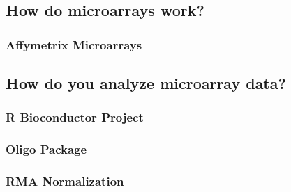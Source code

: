 \subsection{How do microarrays work?} 
\subsubsection{Affymetrix Microarrays}
\subsection{How do you analyze microarray data?}
\subsubsection{R Bioconductor Project}
\subsubsection{Oligo Package}
\subsubsection{RMA Normalization}